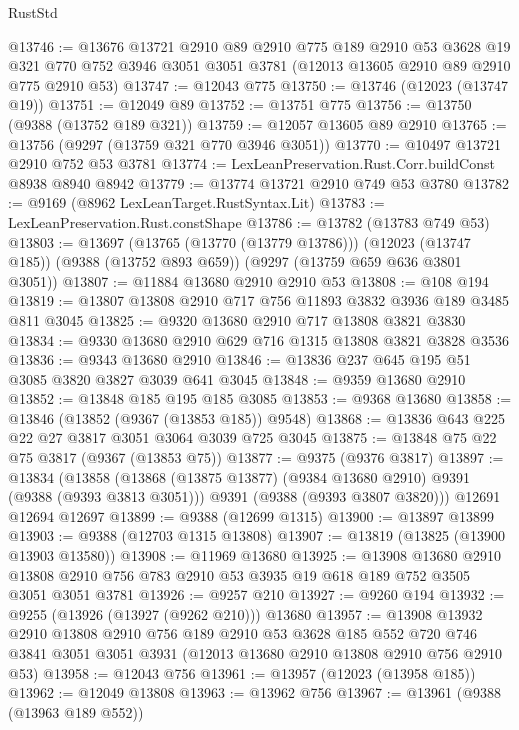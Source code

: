 \begin{lexlean}{RustStd}
\begin{coremodule}
@13746 := @13676
    @13721
    @2910
    @89
    @2910
    @775
    @189
    @2910
    @53
    @3628
    @19
    @321
    @770
    @752
    @3946
    @3051
    @3051
    @3781
    (@12013 @13605 @2910 @89 @2910 @775 @2910 @53)
@13747 := @12043 @775
@13750 := @13746 (@12023 (@13747 @19))
@13751 := @12049 @89
@13752 := @13751 @775
@13756 := @13750 (@9388 (@13752 @189 @321))
@13759 := @12057 @13605 @89 @2910
@13765 := @13756 (@9297 (@13759 @321 @770 @3946 @3051))
@13770 := @10497 @13721 @2910 @752 @53 @3781
@13774 := LexLeanPreservation.Rust.Corr.buildConst @8938 @8940 @8942
@13779 := @13774 @13721 @2910 @749 @53 @3780
@13782 := @9169 (@8962 LexLeanTarget.RustSyntax.Lit)
@13783 := LexLeanPreservation.Rust.constShape
@13786 := @13782 (@13783 @749 @53)
@13803 := @13697
    (@13765 (@13770 (@13779 @13786)))
    (@12023 (@13747 @185))
    (@9388 (@13752 @893 @659))
    (@9297 (@13759 @659 @636 @3801 @3051))
@13807 := @11884 @13680 @2910 @2910 @53
@13808 := @108 @194
@13819 := @13807 @13808 @2910 @717 @756 @11893 @3832 @3936 @189 @3485 @811 @3045
@13825 := @9320 @13680 @2910 @717 @13808 @3821 @3830
@13834 := @9330 @13680 @2910 @629 @716 @1315 @13808 @3821 @3828 @3536
@13836 := @9343 @13680 @2910
@13846 := @13836 @237 @645 @195 @51 @3085 @3820 @3827 @3039 @641 @3045
@13848 := @9359 @13680 @2910
@13852 := @13848 @185 @195 @185 @3085
@13853 := @9368 @13680
@13858 := @13846 (@13852 (@9367 (@13853 @185)) @9548)
@13868 := @13836 @643 @225 @22 @27 @3817 @3051 @3064 @3039 @725 @3045
@13875 := @13848 @75 @22 @75 @3817 (@9367 (@13853 @75))
@13877 := @9375 (@9376 @3817)
@13897 := @13834
    (@13858
      (@13868 (@13875 @13877) (@9384 @13680 @2910) @9391 (@9388 (@9393 @3813 @3051)))
      @9391
      (@9388 (@9393 @3807 @3820)))
    @12691
    @12694
    @12697
@13899 := @9388 (@12699 @1315)
@13900 := @13897 @13899
@13903 := @9388 (@12703 @1315 @13808)
@13907 := @13819 (@13825 (@13900 @13903 @13580))
@13908 := @11969 @13680
@13925 := @13908
    @13680
    @2910
    @13808
    @2910
    @756
    @783
    @2910
    @53
    @3935
    @19
    @618
    @189
    @752
    @3505
    @3051
    @3051
    @3781
@13926 := @9257 @210
@13927 := @9260 @194
@13932 := @9255 (@13926 (@13927 (@9262 @210))) @13680
@13957 := @13908
    @13932
    @2910
    @13808
    @2910
    @756
    @189
    @2910
    @53
    @3628
    @185
    @552
    @720
    @746
    @3841
    @3051
    @3051
    @3931
    (@12013 @13680 @2910 @13808 @2910 @756 @2910 @53)
@13958 := @12043 @756
@13961 := @13957 (@12023 (@13958 @185))
@13962 := @12049 @13808
@13963 := @13962 @756
@13967 := @13961 (@9388 (@13963 @189 @552))

\end{coremodule}
\end{lexlean}
